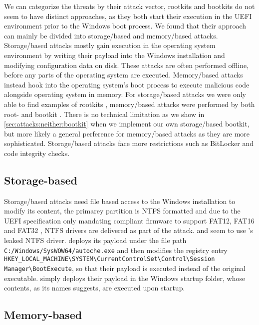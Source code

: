 We can categorize the threats by their attack vector, rootkits and bootkits do not seem to have distinct approaches, as they both start their execution in the \ac{UEFI} environment prior to the Windows boot process.
We found that their approach can mainly be divided into storage\-/based and memory\-/based attacks.
Storage\-/based attacks mostly gain execution in the operating system  environment by writing their payload into the Windows installation and modifying configuration data on disk. These attacks are often performed offline, before any parts of the operating system are executed. Memory\-/based attacks instead hook into the operating system's boot process to execute malicious code alongside operating system in memory. For storage\-/based attacks we were only able to find examples of rootkits \cite{vector-edk,mosaicregressor,lojax}, memory\-/based attacks were performed by both root- and bootkit \cite{dreamboot,efiguard,especter,finspy,moonbounce,cosmicstrand}.
There is no technical limitation as we show in \autoref{sec:attacks:neither:bootkit} when we implement our own storage\-/based bootkit, but more likely a general perference for memory\-/based attacks as they are more sophisticated. Storage\-/based attacks face more restrictions such as BitLocker and code integrity checks.

\subsection{Storage-based}

Storage\-/based attacks need file based access to the Windows installation to modify its content, the primarey partition is \ac{NTFS} formatted and due to the \ac{UEFI} specification only mandating compliant firmware to support \ac{FAT}12, \ac{FAT}16 and \ac{FAT}32 \cite[Section 13.3.1.1]{uefi-spec}, \ac{NTFS} drivers are delivered as part of the attack. \cite{mosaicregressor} and \cite{lojax} seem to use \cite{vector-edk}'s leaked \ac{NTFS} driver. \cite{lojax} deploys its payload under the file path \lstinline{C:/Windows/SysWOW64/autoche.exe} and then modifies the registry entry \lstinline{HKEY_LOCAL_MACHINE\SYSTEM\CurrentControlSet\Control\Session Manager\BootExecute}, so that their payload is executed instead of the original executable. \cite{mosaicregressor} simply deploys their payload in the Windows startup folder, whose contents, as its names suggests, are executed upon startup.

\subsection{Memory-based}

